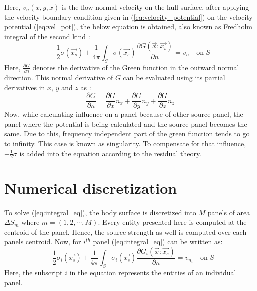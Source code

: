 Here, $v_n(x, y, x)$ is the flow normal velocity on the hull surface, after applying the 
velocity boundary condition given in (\ref{eq:velocity_potential}) on the velocity 
potential (\ref{eq:vel_pot}), the below equation is obtained, also known as Fredholm integral 
of the second kind :
\begin{equation}
    \label{eq:integral_eq}
    -\frac{1}{2}\sigma(\vec{x_s}) + \frac{1}{4\pi}\int_S\sigma(\vec{x_s})\frac{\partial G(\vec{x}:\vec{x_s})}{\partial n} = v_n \quad \text{on}\; S
\end{equation}
Here, $\frac{\partial G}{\partial n}$ denotes the derivative of the Green function in the outward normal direction. This normal derivative of $G$ can be 
evaluated using its partial derivatives in $x$, $y$ and $z$ as :
\begin{equation}
    \frac{\partial G}{\partial n} = \frac{\partial G}{\partial x}n_x + \frac{\partial G}{\partial y}n_y + \frac{\partial G}{\partial z}n_z
\end{equation}
Now, while calculating influence on a panel because of other source panel, the panel where the 
potential is being calculated and the source panel becomes the same. Due to this, frequency 
independent part of the green function tends to go to infinity. This case is known as 
singularity. To compensate for that influence, $-\frac{1}{2}\sigma$ is added into the 
equation according to the residual theory.



\section{Numerical discretization}
\label{sec:numerical_dis}
To solve (\ref{eq:integral_eq}), the body surface is discretized into $M$ panels of area 
$\Delta S_m$ where $m = (1, 2, \cdots, M)$. Every entity presented here is computed at the centroid of the panel.
Hence, the source strength as well is computed over each panels centroid. Now, for $i^{th}$ panel 
(\ref{eq:integral_eq}) can be written as:
\begin{equation}
    \label{eq:dis_integral_eq}
    -\frac{1}{2}\sigma_i(\vec{x_s}) + \frac{1}{4\pi}\int_S\sigma_i(\vec{x_s})\frac{\partial G_i(\vec{x}:\vec{x_s})}{\partial n} = v_{n_i} \quad \text{on}\; S
\end{equation}
Here, the subscript $i$ in the equation represents the entities of an individual panel.

